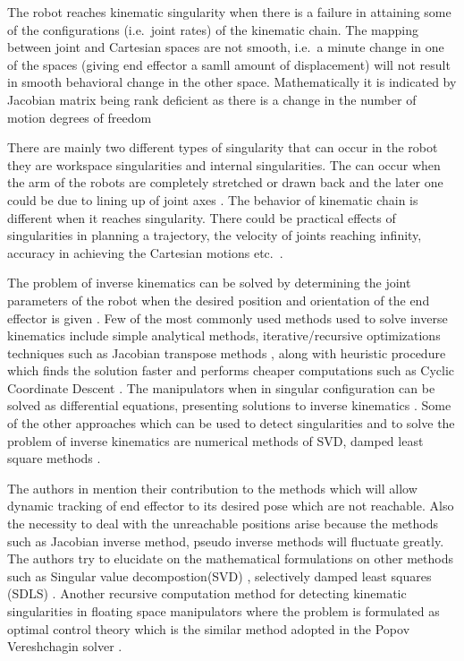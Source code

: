 The robot reaches kinematic singularity when there is a failure in attaining some of the configurations (i.e.\ joint rates) of the kinematic chain. The mapping between joint and Cartesian spaces are not smooth, i.e.\ a minute change in one of the spaces (giving end effector a samll amount of displacement) will not result in smooth behavioral change in the other space. Mathematically it is indicated by Jacobian matrix being rank deficient as there is a change in the number of motion degrees of freedom \cite{bryunixonline} 
\par
There are mainly two different types of singularity that can occur in the robot they are workspace singularities and internal singularities. The can occur when the arm of the robots are completely stretched or drawn back and the later one could be due to lining up of joint axes \cite{donelan2010kinematic}. The behavior of kinematic chain is different when it reaches singularity. There could be practical effects of singularities in planning a trajectory, the velocity of joints reaching infinity, accuracy in achieving the Cartesian motions etc.\ \cite{bryunixonline}. 
\par
The problem of inverse kinematics can be solved by determining the joint parameters of the robot when the desired position and orientation of the end effector is given \cite{Buss2004}. Few of the most commonly used methods used to solve inverse kinematics include simple analytical methods, iterative/recursive optimizations techniques such as Jacobian transpose methods \cite{balestrino1984robust}, along with heuristic procedure which finds the solution faster and performs cheaper computations such as Cyclic Coordinate Descent \cite{luenberger1984linear}. The manipulators when in singular configuration can be solved as differential equations, presenting solutions to inverse kinematics \cite{siciliano2010robotics}. Some of the other approaches which can be used to detect singularities and to solve the problem of inverse kinematics are numerical methods of SVD, damped least square methods \cite{szkodny2014avoiding}.
\par
The authors in \cite{Buss2004} mention their contribution to the methods which will allow dynamic tracking of end effector to its desired pose which are not reachable. Also the necessity to deal with the unreachable positions arise because the methods such as Jacobian inverse method, pseudo inverse methods will fluctuate greatly. The authors try to elucidate on the mathematical formulations on other methods such as Singular value decompostion(SVD) \cite{de1994singular}, selectively damped least squares (SDLS) \cite{buss2005selectively} \cite{Buss2004}. Another recursive computation method for detecting kinematic singularities in floating space manipulators where the problem is formulated as optimal control theory which is the similar method adopted in the Popov Vereshchagin solver \cite{le2008kinematics}. 
